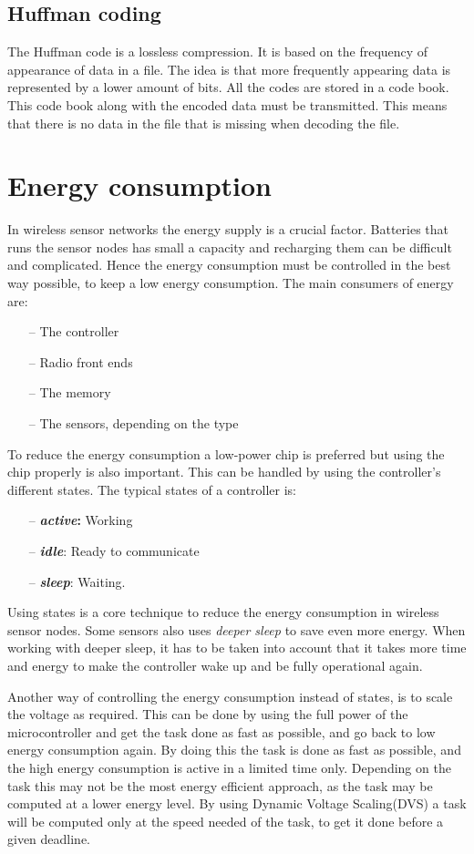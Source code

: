 \subsection{Huffman coding}
The Huffman code is a lossless compression. It is based on the frequency of appearance of data in a file. The idea is that more frequently appearing data is represented by a lower amount of bits.
All the codes are stored in a code book. This code book along with the encoded data must be transmitted. This means that there is no data in the file that is missing when decoding the file.

\section{Energy consumption}
In wireless sensor networks the energy supply is a crucial factor. Batteries that runs the sensor nodes has small a capacity and recharging them can be difficult and complicated. Hence the energy consumption must be controlled in the best way possible, to keep a low energy consumption.
The main consumers of energy are:
\begin{itemize}
	\item[--] The controller
	\item[--] Radio front ends
	\item[--] The memory
	\item[--] The sensors, depending on the type
\end{itemize}
	 
To reduce the energy consumption a low-power chip is preferred but using the chip properly is also important. This can be handled by using the controller's different states. The typical states of a controller is:
\begin{itemize}
	\item[--] \textbf{\emph{active}:} Working 
	\item[--] \textbf{\emph{idle}}: Ready to communicate 
	\item[--] \textbf{\emph{sleep}}: Waiting.
\end{itemize}

Using states is a core technique to reduce the energy consumption in wireless sensor nodes. Some sensors also uses \emph{deeper sleep} to save even more energy. When working with deeper sleep, it has to be taken into account that it takes more time and energy to make the controller wake up and be fully operational again.

Another way of controlling the energy consumption instead of states, is to scale the voltage as required. This can be done by using the full power of the microcontroller and get the task done as fast as possible, and go back to low energy consumption again. By doing this the task is done as fast as possible, and the high energy consumption is active in a limited time only. Depending on the task this may not be the most energy efficient approach, as the task may be computed at a lower energy level. By using Dynamic Voltage Scaling(DVS) a task will be computed only at the speed needed of the task, to get it done before a given deadline.

